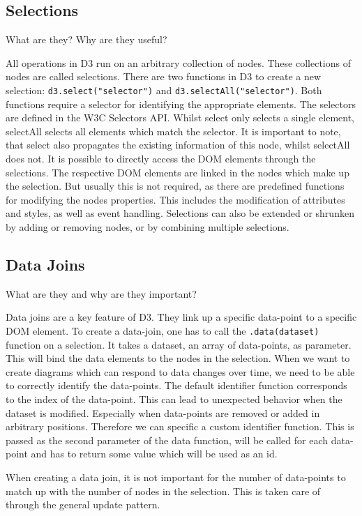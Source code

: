 \subsection{Selections}
What are they? Why are they useful?

All operations in D3 run on an arbitrary collection of nodes. These collections of nodes are called selections. There are two functions in D3 to create a new selection: \verb|d3.select("selector")| and \verb|d3.selectAll("selector")|. Both functions require a selector for identifying the appropriate elements. The selectors are defined in the W3C Selectors API\cite{w3c_selectors_api}. Whilst select only selects a single element, selectAll selects all elements which match the selector. It is important to note, that select also propagates the existing information of this node, whilst selectAll does not.
It is possible to directly access the DOM elements through the selections. The respective DOM elements are linked in the nodes which make up the selection. But usually this is not required, as there are predefined functions for modifying the nodes properties. This includes the modification of attributes and styles, as well as event handling. 
Selections can also be extended or shrunken by adding or removing nodes, or by combining multiple selections.

\subsection{Data Joins}
What are they and why are they important?

Data joins are a key feature of D3. They link up a specific data-point to a specific DOM element. To create a data-join, one has to call the \verb|.data(dataset)| function on a selection. It takes a dataset, an array of data-points, as parameter. This will bind the data elements to the nodes in the selection. When we want to create diagrams which can respond to data changes over time, we need to be able to correctly identify the data-points. The default identifier function corresponds to the index of the data-point. This can lead to unexpected behavior when the dataset is modified. Especially when data-points are removed or added in arbitrary positions. Therefore we can specific a custom identifier function. This is passed as the second parameter of the data function, will be called for each data-point and has to return some value which will be used as an id.

When creating a data join, it is not important for the number of data-points to match up with the number of nodes in the selection. This is taken care of through the general update pattern.

